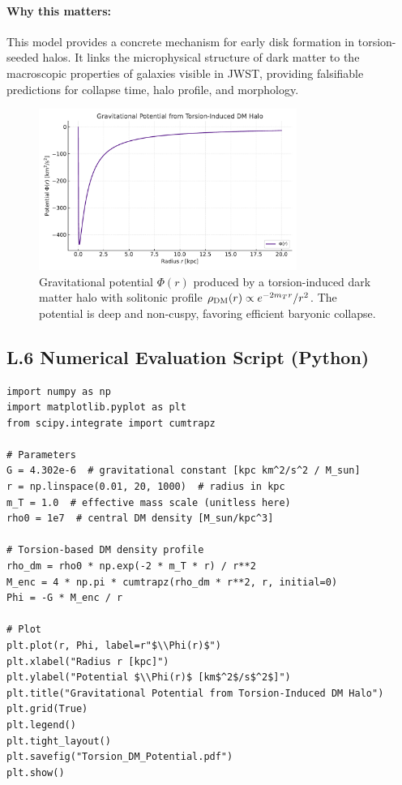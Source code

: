 \documentclass{article}
\begin{document}
\paragraph{Why this matters:}
This model provides a concrete mechanism for early disk formation in torsion-seeded halos. It links the microphysical structure of dark matter to the macroscopic properties of galaxies visible in JWST, providing falsifiable predictions for collapse time, halo profile, and morphology.

\begin{figure}[h!]
\centering
\includegraphics[width=0.75\textwidth]{Torsion_DM_Potential.pdf}
\caption{Gravitational potential $\Phi(r)$ produced by a torsion-induced dark matter halo with solitonic profile $\rho_{\rm DM}(r) \propto e^{-2m_T r}/r^2$. The potential is deep and non-cuspy, favoring efficient baryonic collapse.}
\label{fig:torsion_potential}
\end{figure}


\subsection*{L.6 Numerical Evaluation Script (Python)}
\begin{verbatim}
import numpy as np
import matplotlib.pyplot as plt
from scipy.integrate import cumtrapz

# Parameters
G = 4.302e-6  # gravitational constant [kpc km^2/s^2 / M_sun]
r = np.linspace(0.01, 20, 1000)  # radius in kpc
m_T = 1.0  # effective mass scale (unitless here)
rho0 = 1e7  # central DM density [M_sun/kpc^3]

# Torsion-based DM density profile
rho_dm = rho0 * np.exp(-2 * m_T * r) / r**2
M_enc = 4 * np.pi * cumtrapz(rho_dm * r**2, r, initial=0)
Phi = -G * M_enc / r

# Plot
plt.plot(r, Phi, label=r"$\\Phi(r)$")
plt.xlabel("Radius r [kpc]")
plt.ylabel("Potential $\\Phi(r)$ [km$^2$/s$^2$]")
plt.title("Gravitational Potential from Torsion-Induced DM Halo")
plt.grid(True)
plt.legend()
plt.tight_layout()
plt.savefig("Torsion_DM_Potential.pdf")
plt.show()
\end{verbatim}
\end{document}
